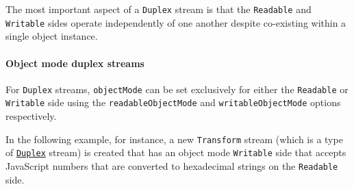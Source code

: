 The most important aspect of a \texttt{Duplex} stream is that the
\texttt{Readable} and \texttt{Writable} sides operate independently of
one another despite co-existing within a single object instance.

\paragraph{Object mode duplex streams}\label{object-mode-duplex-streams}

For \texttt{Duplex} streams, \texttt{objectMode} can be set exclusively
for either the \texttt{Readable} or \texttt{Writable} side using the
\texttt{readableObjectMode} and \texttt{writableObjectMode} options
respectively.

In the following example, for instance, a new \texttt{Transform} stream
(which is a type of \hyperref[class-streamduplex]{\texttt{Duplex}}
stream) is created that has an object mode \texttt{Writable} side that
accepts JavaScript numbers that are converted to hexadecimal strings on
the \texttt{Readable} side.

